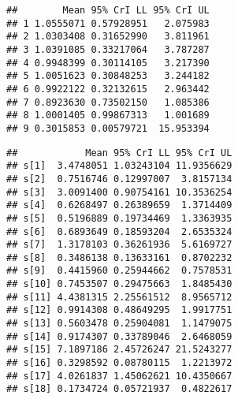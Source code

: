 \documentclass[]{article}
\newenvironment{Shaded}{\begin{snugshade}}{\end{snugshade}}
\newcommand{\CommentTok}[1]{\textcolor[rgb]{0.56,0.35,0.01}{\textit{#1}}}
\newcommand{\ControlFlowTok}[1]{\textcolor[rgb]{0.13,0.29,0.53}{\textbf{#1}}}
\newcommand{\DataTypeTok}[1]{\textcolor[rgb]{0.13,0.29,0.53}{#1}}
\newcommand{\DecValTok}[1]{\textcolor[rgb]{0.00,0.00,0.81}{#1}}
\newcommand{\FloatTok}[1]{\textcolor[rgb]{0.00,0.00,0.81}{#1}}
\newcommand{\KeywordTok}[1]{\textcolor[rgb]{0.13,0.29,0.53}{\textbf{#1}}}
\newcommand{\NormalTok}[1]{#1}
\newcommand{\OperatorTok}[1]{\textcolor[rgb]{0.81,0.36,0.00}{\textbf{#1}}}
\newcommand{\StringTok}[1]{\textcolor[rgb]{0.31,0.60,0.02}{#1}}
\begin{document}
\begin{verbatim}
##        Mean 95% CrI LL 95% CrI UL
## 1 1.0555071 0.57928951   2.075983
## 2 1.0303408 0.31652990   3.811961
## 3 1.0391085 0.33217064   3.787287
## 4 0.9948399 0.30114105   3.217390
## 5 1.0051623 0.30848253   3.244182
## 6 0.9922122 0.32132615   2.963442
## 7 0.8923630 0.73502150   1.085386
## 8 1.0001405 0.99867313   1.001689
## 9 0.3015853 0.00579721  15.953394
\end{verbatim}

\begin{Shaded}
\end{Shaded}

\begin{verbatim}
##            Mean 95% CrI LL 95% CrI UL
## s[1]  3.4748051 1.03243104 11.9356629
## s[2]  0.7516746 0.12997007  3.8157134
## s[3]  3.0091400 0.90754161 10.3536254
## s[4]  0.6268497 0.26389659  1.3714409
## s[5]  0.5196889 0.19734469  1.3363935
## s[6]  0.6893649 0.18593204  2.6535324
## s[7]  1.3178103 0.36261936  5.6169727
## s[8]  0.3486138 0.13633161  0.8702232
## s[9]  0.4415960 0.25944662  0.7578531
## s[10] 0.7453507 0.29475663  1.8485430
## s[11] 4.4381315 2.25561512  8.9565712
## s[12] 0.9914308 0.48649295  1.9917751
## s[13] 0.5603478 0.25904081  1.1479075
## s[14] 0.9174307 0.33789046  2.6468059
## s[15] 7.1897186 2.45726247 21.5243277
## s[16] 0.3298592 0.08780115  1.2213972
## s[17] 4.0261837 1.45062621 10.4350667
## s[18] 0.1734724 0.05721937  0.4822617
\end{verbatim}
\end{document}
